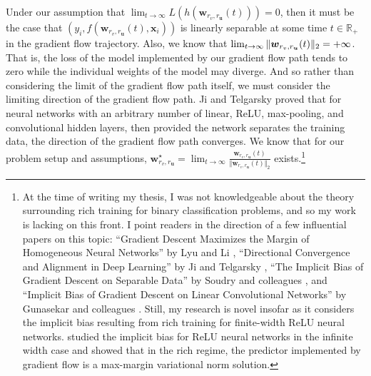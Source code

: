 \documentclass{article}
\begin{document}
Under our assumption that $\lim_{t \to \infty} L(h(\boldsymbol{w}_{r_v, r_{\boldsymbol{u}}}(t))) = 0$, then it must be the case that $(y_i, f(\boldsymbol{w}_{r_v, r_{\boldsymbol{u}}}(t), \boldsymbol{x}_i))$ is linearly separable at some time $t \in \mathbb{R}_+$ in the gradient flow trajectory. Also, we know that $\lim_{t \to \infty} \Vert \boldsymbol{w}_{r_v, r_{\boldsymbol{u}}}(t) \Vert_2\\ = +\infty$. That is, the loss of the model implemented by our gradient flow path tends to zero while the individual weights of the model may diverge. And so rather than considering the limit of the gradient flow path itself, we must consider the limiting direction of the gradient flow path. Ji and Telgarsky proved that for neural networks with an arbitrary number of linear, ReLU, max-pooling, and convolutional hidden layers, then provided the network separates the training data, the direction of the gradient flow path converges. We know that for our problem setup and assumptions, $\boldsymbol{w}_{r_v, r_{\boldsymbol{u}}}^{\star} = \lim_{t \to \infty} \frac{\boldsymbol{w}_{r_v, r_{\boldsymbol{u}}}(t)}{\Vert \boldsymbol{w}_{r_v, r_{\boldsymbol{u}}}(t) \Vert_2}$ exists.\footnote{At the time of writing my thesis, I was not knowledgeable about the theory surrounding rich training for binary classification problems, and so my work is lacking on this front. I point readers in the direction of a few influential papers on this topic: \enquote{Gradient Descent Maximizes the Margin of Homogeneous Neural Networks} by Lyu and Li \cite{lyu2019gradient}, \enquote{Directional Convergence and Alignment in Deep Learning} by Ji and Telgarsky \cite{ji2020directional}, \enquote{The Implicit Bias of
Gradient Descent on Separable Data} by Soudry and colleagues \cite{soudry2018implicit}, and \enquote{Implicit Bias of Gradient Descent on Linear Convolutional Networks} by Gunasekar and colleagues \cite{gunasekar2018implicitconv}. Still, my research is novel insofar as it considers the implicit bias resulting from rich training for finite-width ReLU neural networks. \cite{chizat2020implicit} studied the implicit bias for ReLU neural networks in the infinite width case and showed that in the rich regime, the predictor implemented by gradient flow is a max-margin variational norm solution.}
\end{document}
